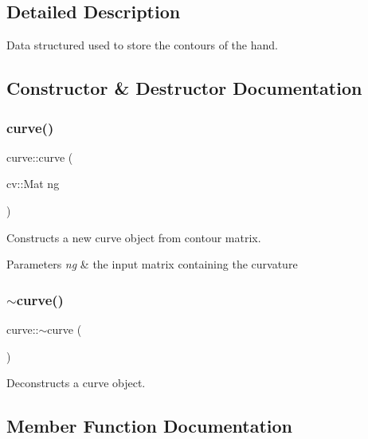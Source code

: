 \subsection{Detailed Description}
Data structured used to store the contours of the hand. 

\subsection{Constructor \& Destructor Documentation}
\hypertarget{structcurve_aa067033135a192272005a3ae557a4f25}{}\label{structcurve_aa067033135a192272005a3ae557a4f25} 
\subsubsection{\texorpdfstring{curve()}{curve()}}
{\footnotesize\ttfamily curve\+::curve (\begin{DoxyParamCaption}\item[{cv\+::\+Mat}]{ng }\end{DoxyParamCaption})}



Constructs a new curve object from contour matrix. 


\begin{DoxyParams}{Parameters}
{\em ng} & the input matrix containing the curvature \\
\hline
\end{DoxyParams}
\hypertarget{structcurve_a0bacd81cfa6ed01251210d2e5d6b29a4}{}\label{structcurve_a0bacd81cfa6ed01251210d2e5d6b29a4} 
\subsubsection{\texorpdfstring{$\sim$curve()}{~curve()}}
{\footnotesize\ttfamily curve\+::$\sim$curve (\begin{DoxyParamCaption}{ }\end{DoxyParamCaption})}



Deconstructs a curve object. 



\subsection{Member Function Documentation}
\hypertarget{structcurve_aa4847c1d83d062c243ef641f67144cd0}{}\label{structcurve_aa4847c1d83d062c243ef641f67144cd0} 
